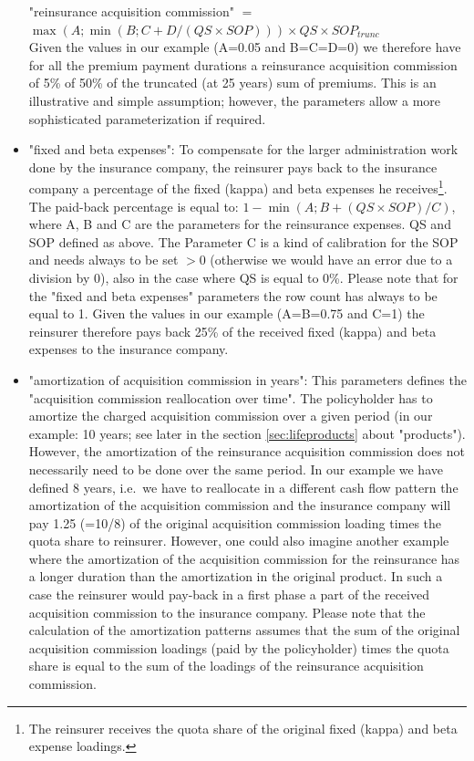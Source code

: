 \begin{itemize}
"reinsurance acquisition commission" $=$ \\
$\max (A; \min (B; C + D/(QS \times SOP))) \times QS \times SOP_{trunc}$ \\
Given the values in our example (A=0.05 and B=C=D=0) we therefore have for all the premium payment durations a reinsurance acquisition commission of 5\% of 50\% of the truncated (at 25 years) sum of premiums. This is an illustrative and simple assumption; however, the parameters allow a more sophisticated parameterization if required.
	\item "fixed and beta expenses": To compensate for the larger administration work done by the insurance company, the reinsurer pays back to the insurance company a percentage of the fixed (kappa) and beta expenses he receives\footnote{The reinsurer receives the quota share of the original fixed (kappa) and beta expense loadings.}.{}
The paid-back percentage is equal to: $1 - \min (A; B + (QS \times SOP)/C)$, where A, B and C are the parameters for the reinsurance expenses. QS and SOP defined as above. The Parameter C is a kind of calibration for the SOP and needs always to be set $> 0$ (otherwise we would have an error due to a division by 0), also in the case where QS is equal to 0\%. Please note that for the "fixed and beta expenses" parameters the row count has always to be equal to 1.
Given the values in our example (A=B=0.75 and C=1) the reinsurer therefore pays back 25\% of the received fixed (kappa) and beta expenses to the insurance company. 
	\item "amortization of acquisition commission in years": This parameters defines the "acquisition commission reallocation over time". The policyholder has to amortize the charged acquisition commission over a given period (in our example: 10 years; see later in the section \ref{sec:lifeproducts} about "products"). However, the amortization of the reinsurance acquisition commission does not necessarily need to be done over the same period. In our example we have defined 8 years, i.e.~we have to reallocate in a different cash flow pattern the amortization of the acquisition commission and the insurance company will pay 1.25 (=10/8) of the original acquisition commission loading times the quota share to reinsurer. However, one could also imagine another example where the amortization of the acquisition commission for the reinsurance has a longer duration than the amortization in the original product. In such a case the reinsurer would pay-back in a first phase a part of the received acquisition commission to the insurance company. Please note that the calculation of the amortization patterns assumes that the sum of the original acquisition commission loadings (paid by the policyholder) times the quota share is equal to the sum of the loadings of the reinsurance acquisition commission.
\end{itemize}

